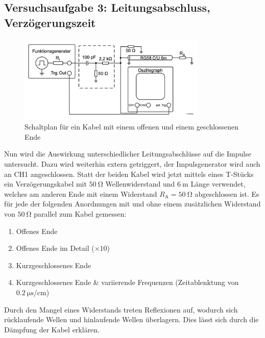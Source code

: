 \documentclass{article}
\begin{document}
\clearpage

\subsection{Versuchsaufgabe 3: Leitungsabschluss, Verzögerungszeit}
			
			\begin{figure}[H]
				\centering
				\includegraphics[width=0.8\textwidth]{figs/Aufbau_1_3_Leitungsabschluss.png}
				\caption{Schaltplan für ein Kabel mit einem offenen und einem geschlossenen Ende~\cite{anleitung}}
				\label{fig:aufbau_1_3_leitungsabschluss}
			\end{figure}
			Nun wird die Auswirkung unterschiedlicher Leitungsabschlüsse auf die Impulse untersucht. Dazu wird weiterhin extern getriggert, der Impulsgenerator wird auch an CH1 angeschlossen. Statt der beiden Kabel wird jetzt mittels eines T-Stücks ein Verzögerungskabel mit $\SI{50}{\ohm}$ Wellenwiderstand und $\SI{6}{\meter}$ Länge verwendet, welches am anderen Ende mit einem Widerstand $R_\mathrm{A} = \SI{50}{\ohm}$ abgeschlossen ist. Es für jede der folgenden Anordnungen mit und ohne einem zusätzlichen Widerstand von $\SI{50}{\ohm}$ parallel zum Kabel gemessen:
			\begin{enumerate}[label=\alph*]
				\item Offenes Ende
				\item Offenes Ende im Detail ($\times 10$)
				\item Kurzgeschlossenes Ende
				\item Kurzgeschlossenes Ende \& variierende Frequenzen (Zeitablenktung von $\SI{0.2}{\micro\second\per\centi\meter}$)
			\end{enumerate}

            Durch den Mangel eines Widerstands treten Reflexionen auf, wodurch sich rücklaufende Wellen und hinlaufende Wellen
            überlagern. Dies lässt sich durch die Dämpfung der Kabel erklären. 
\end{document}
